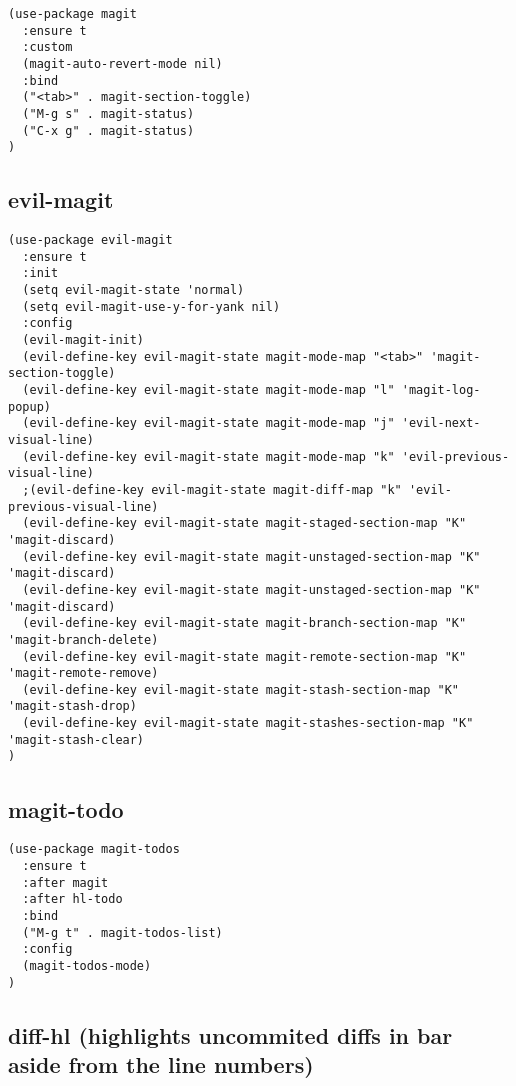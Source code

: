 \documentclass[11pt]{article}
\begin{document}
\begin{verbatim}
(use-package magit
  :ensure t
  :custom
  (magit-auto-revert-mode nil)
  :bind
  ("<tab>" . magit-section-toggle)
  ("M-g s" . magit-status)
  ("C-x g" . magit-status)
)
\end{verbatim}

\subsection*{evil-magit}
\label{sec:orge8458d2}
\begin{verbatim}
(use-package evil-magit
  :ensure t
  :init
  (setq evil-magit-state 'normal)
  (setq evil-magit-use-y-for-yank nil)
  :config
  (evil-magit-init)
  (evil-define-key evil-magit-state magit-mode-map "<tab>" 'magit-section-toggle)
  (evil-define-key evil-magit-state magit-mode-map "l" 'magit-log-popup)
  (evil-define-key evil-magit-state magit-mode-map "j" 'evil-next-visual-line)
  (evil-define-key evil-magit-state magit-mode-map "k" 'evil-previous-visual-line)
  ;(evil-define-key evil-magit-state magit-diff-map "k" 'evil-previous-visual-line)
  (evil-define-key evil-magit-state magit-staged-section-map "K" 'magit-discard)
  (evil-define-key evil-magit-state magit-unstaged-section-map "K" 'magit-discard)
  (evil-define-key evil-magit-state magit-unstaged-section-map "K" 'magit-discard)
  (evil-define-key evil-magit-state magit-branch-section-map "K" 'magit-branch-delete)
  (evil-define-key evil-magit-state magit-remote-section-map "K" 'magit-remote-remove)
  (evil-define-key evil-magit-state magit-stash-section-map "K" 'magit-stash-drop)
  (evil-define-key evil-magit-state magit-stashes-section-map "K" 'magit-stash-clear)
)
\end{verbatim}

\subsection*{magit-todo}
\label{sec:org1be0583}

\begin{verbatim}
(use-package magit-todos
  :ensure t
  :after magit
  :after hl-todo
  :bind
  ("M-g t" . magit-todos-list)
  :config
  (magit-todos-mode)
)
\end{verbatim}

\subsection*{diff-hl (highlights uncommited diffs in bar aside from the line numbers)}
\label{sec:org72d96e1}
\end{document}
